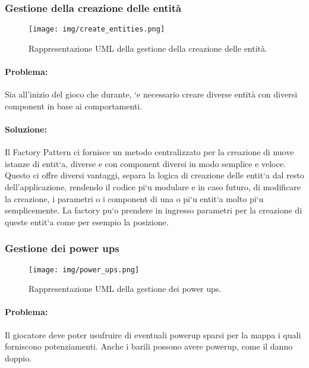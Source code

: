 \subsubsection{Gestione della creazione delle entità}

\begin{figure}[H]
\centering{}
\texttt{[image: img/create\_entities.png]}
\caption{Rappresentazione UML della gestione della creazione delle entità.}
\end{figure}

\paragraph{Problema:}
Sia all’inizio del gioco che durante, `e necessario creare diverse entità con diversi component in base ai comportamenti.

\paragraph{Soluzione:}
Il Factory Pattern ci fornisce un metodo centralizzato per la creazione di nuove istanze di entit`a, diverse e con component diversi in modo semplice e veloce. Questo ci offre diversi vantaggi, separa la logica di creazione delle entit`a dal resto dell’applicazione, rendendo il codice pi`u modulare e in caso futuro, di modificare la creazione, i parametri o i component di una o pi`u entit`a molto pi`u semplicemente. La factory pu`o prendere in ingresso parametri per la creazione di queste entit`a come per esempio la posizione.

\subsubsection{Gestione dei power ups}

\begin{figure}[H]
\centering{}
\texttt{[image: img/power\_ups.png]}
\caption{Rappresentazione UML della gestione dei power ups.}
\end{figure}

\paragraph{Problema:}
Il giocatore deve poter usufruire di eventuali powerup sparsi per la mappa i quali forniscono potenziamenti. Anche i barili possono avere powerup, come il danno doppio.

